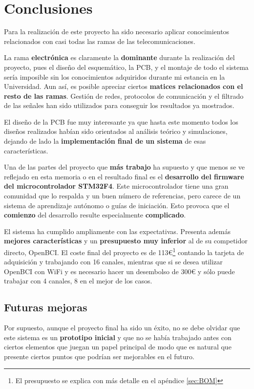 \chapter{Conclusiones\label{sec:conclusiones}}

Para la realización de este proyecto ha sido necesario aplicar conocimientos relacionados con casi todas las ramas de las telecomunicaciones.

La rama \textbf{electrónica} es claramente la \textbf{dominante} durante la realización del proyecto, pues el diseño del esquemático, la \acrshort{PCB}, y el montaje de todo el sistema sería imposible sin los conocimientos adquiridos durante mi estancia en la Universidad. Aun así, es posible apreciar ciertos \textbf{matices relacionados con el resto de las ramas}. Gestión de redes, protocolos de comunicación y el filtrado de las señales han sido utilizados para conseguir los resultados ya mostrados.

El diseño de la \acrshort{PCB} fue muy interesante ya que hasta este momento todos los diseños realizados habían sido orientados al análisis teórico y simulaciones, dejando de lado la \textbf{implementación final de un sistema} de esas características.

Una de las partes del proyecto que \textbf{más trabajo} ha supuesto y que menos se ve reflejado en esta memoria o en el resultado final es el \textbf{desarrollo del firmware del microcontrolador STM32F4}. Este microcontrolador tiene una gran comunidad que lo respalda y un buen número de referencias, pero carece de un sistema de aprendizaje autónomo o guías de iniciación. Esto provoca que el \textbf{comienzo} del desarrollo resulte especialmente \textbf{complicado}.

El sistema ha cumplido ampliamente con las expectativas. Presenta además \textbf{mejores características} y un \textbf{presupuesto muy inferior} al de su competidor directo, OpenBCI. El coste final del proyecto es de 113€\footnote{El presupuesto se explica con más detalle en el apéndice \ref{sec:BOM}} contando la tarjeta de adquisición y trabajando con 16 canales, mientras que si se desea utilizar OpenBCI con WiFi y es necesario hacer un desembolso de 300€ y sólo puede trabajar con 4 canales, 8 en el mejor de los casos.

\section{Futuras mejoras}

Por supuesto, aunque el proyecto final ha sido un éxito, no se debe olvidar que este sistema es un \textbf{prototipo inicial} y que no se había trabajado antes con ciertos elementos que juegan un papel principal de modo que es natural que presente ciertos puntos que podrían ser mejorables en el futuro.

